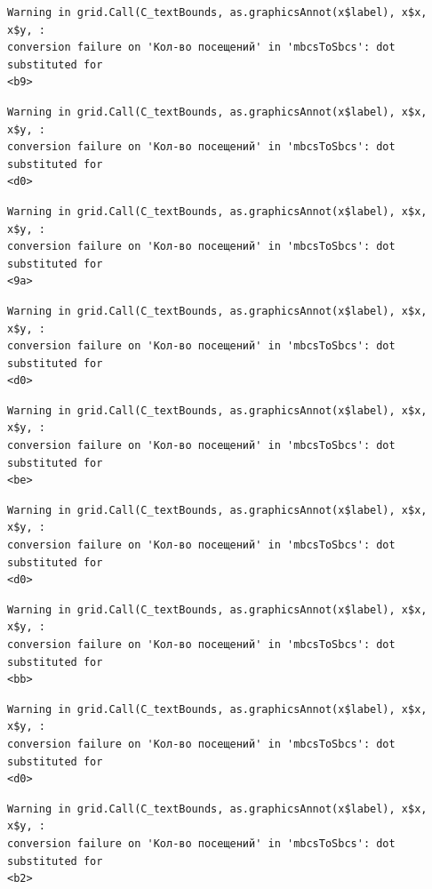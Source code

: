 \documentclass[
  letterpaper,
  DIV=11,
  numbers=noendperiod]{scrartcl}
\begin{document}
\begin{verbatim}
Warning in grid.Call(C_textBounds, as.graphicsAnnot(x$label), x$x, x$y, :
conversion failure on 'Кол-во посещений' in 'mbcsToSbcs': dot substituted for
<b9>
\end{verbatim}

\begin{verbatim}
Warning in grid.Call(C_textBounds, as.graphicsAnnot(x$label), x$x, x$y, :
conversion failure on 'Кол-во посещений' in 'mbcsToSbcs': dot substituted for
<d0>
\end{verbatim}

\begin{verbatim}
Warning in grid.Call(C_textBounds, as.graphicsAnnot(x$label), x$x, x$y, :
conversion failure on 'Кол-во посещений' in 'mbcsToSbcs': dot substituted for
<9a>
\end{verbatim}

\begin{verbatim}
Warning in grid.Call(C_textBounds, as.graphicsAnnot(x$label), x$x, x$y, :
conversion failure on 'Кол-во посещений' in 'mbcsToSbcs': dot substituted for
<d0>
\end{verbatim}

\begin{verbatim}
Warning in grid.Call(C_textBounds, as.graphicsAnnot(x$label), x$x, x$y, :
conversion failure on 'Кол-во посещений' in 'mbcsToSbcs': dot substituted for
<be>
\end{verbatim}

\begin{verbatim}
Warning in grid.Call(C_textBounds, as.graphicsAnnot(x$label), x$x, x$y, :
conversion failure on 'Кол-во посещений' in 'mbcsToSbcs': dot substituted for
<d0>
\end{verbatim}

\begin{verbatim}
Warning in grid.Call(C_textBounds, as.graphicsAnnot(x$label), x$x, x$y, :
conversion failure on 'Кол-во посещений' in 'mbcsToSbcs': dot substituted for
<bb>
\end{verbatim}

\begin{verbatim}
Warning in grid.Call(C_textBounds, as.graphicsAnnot(x$label), x$x, x$y, :
conversion failure on 'Кол-во посещений' in 'mbcsToSbcs': dot substituted for
<d0>
\end{verbatim}

\begin{verbatim}
Warning in grid.Call(C_textBounds, as.graphicsAnnot(x$label), x$x, x$y, :
conversion failure on 'Кол-во посещений' in 'mbcsToSbcs': dot substituted for
<b2>
\end{verbatim}
\end{document}
